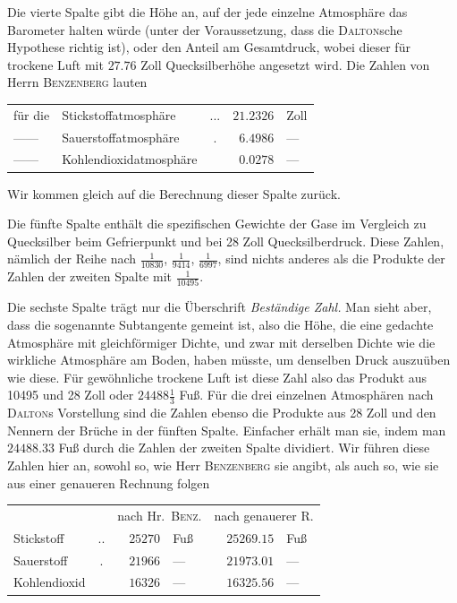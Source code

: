 Die vierte Spalte gibt die Höhe an, auf der jede einzelne Atmosphäre das Barometer halten würde (unter der Voraussetzung, dass die \textsc{Dalton}sche Hypothese richtig ist), oder den Anteil am Gesamtdruck, wobei dieser für trockene Luft mit $27.76$ Zoll Quecksilberhöhe angesetzt wird. Die Zahlen von Herrn \textsc{Benzenberg} lauten
\begin{center}\begin{tabular}{llcrl}
für die & Stickstoffatmosphäre & .\quad .\quad . & $21.2326$ & Zoll\\
—\quad — & Sauerstoffatmosphäre & . & $6.4986$ & —\\
—\quad — & Kohlendioxidatmosphäre & & $0.0278$ & —
\end{tabular}\end{center}
Wir kommen gleich auf die Berechnung dieser Spalte zurück.

Die fünfte Spalte enthält die spezifischen Gewichte der Gase im Vergleich zu Quecksilber beim Gefrierpunkt und bei 28 Zoll Quecksilberdruck. Diese Zahlen, nämlich der Reihe nach $\frac{1}{10830}$, $\frac{1}{9414}$, $\frac{1}{6997}$, sind nichts anderes als die Produkte der Zahlen der zweiten Spalte mit $\frac{1}{10495}$.

Die sechste Spalte trägt nur die Überschrift \textit{Beständige Zahl.} Man sieht aber, dass die sogenannte Subtangente gemeint ist, also die Höhe, die eine gedachte Atmosphäre mit gleichförmiger Dichte, und zwar mit derselben Dichte wie die wirkliche Atmosphäre am Boden, haben müsste, um denselben Druck auszuüben wie diese. Für gewöhnliche trockene Luft ist diese Zahl also das Produkt aus 10495 und 28 Zoll oder $24488\frac{1}{3}$ Fuß. Für die drei einzelnen Atmosphären nach \textsc{Dalton}s Vorstellung sind die Zahlen ebenso die Produkte aus 28 Zoll und den Nennern der Brüche in der fünften Spalte. Einfacher erhält man sie, indem man $24488.33$ Fuß durch die Zahlen der zweiten Spalte dividiert. Wir führen diese Zahlen hier an,
sowohl so, wie Herr \textsc{Benzenberg} sie angibt, als auch so, wie sie aus einer genaueren Rechnung folgen
\begin{center}\begin{tabular}{lcrlrl}
& & \multicolumn{2}{c}{nach Hr.\ \textsc{Benz}.} & \multicolumn{2}{c}{nach genauerer R.}\\
Stickstoff & .\quad . & $25270$ & Fuß & $25269.15$ & Fuß\\
Sauerstoff & . & $21966$ & — & $21973.01$ & —\\
Kohlendioxid & & $16326$ & — & $16325.56$ & —
\end{tabular}\end{center}

